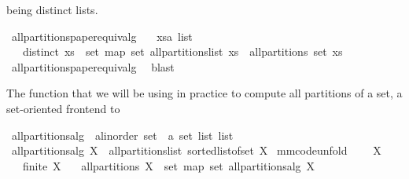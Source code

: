 \begin{isabellebody}
\begin{isamarkuptext}
  being distinct lists.%
\end{isamarkuptext}%
\isamarkuptrue%
\isamarkupfalse%
\ all{\isacharunderscore}partitions{\isacharunderscore}paper{\isacharunderscore}equiv{\isacharunderscore}alg{\isacharcolon}\isanewline
\ \ \ xs{\isacharcolon}{\isacharcolon}{\isachardoublequoteopen}{\isacharprime}a\ list{\isachardoublequoteclose}\isanewline
\ \ \ {\isachardoublequoteopen}distinct\ xs\ {\isasymLongrightarrow}\ set\ {\isacharparenleft}map\ set\ {\isacharparenleft}all{\isacharunderscore}partitions{\isacharunderscore}list\ xs{\isacharparenright}{\isacharparenright}\ {\isacharequal}\ all{\isacharunderscore}partitions\ {\isacharparenleft}set\ xs{\isacharparenright}{\isachardoublequoteclose}\isanewline
%
\isadelimproof
\ \ %
\endisadelimproof
%
\isatagproof
{}\isamarkupfalse%
\ all{\isacharunderscore}partitions{\isacharunderscore}paper{\isacharunderscore}equiv{\isacharunderscore}alg{\isacharprime}\ \isamarkupfalse%
\ blast%
\endisatagproof
{\isafoldproof}%
%
\isadelimproof
%
\endisadelimproof
%
\begin{isamarkuptext}%
The function that we will be using in practice to compute all partitions of a set,
  a set-oriented frontend to %
\end{isamarkuptext}%
\isamarkuptrue%
\isamarkupfalse%
\ all{\isacharunderscore}partitions{\isacharunderscore}alg\ {\isacharcolon}{\isacharcolon}\ {\isachardoublequoteopen}{\isacharprime}a{\isasymColon}linorder\ set\ {\isasymRightarrow}\ {\isacharprime}a\ set\ list\ list{\isachardoublequoteclose}\isanewline
{}\ {\isachardoublequoteopen}all{\isacharunderscore}partitions{\isacharunderscore}alg\ X\ {\isacharequal}\ all{\isacharunderscore}partitions{\isacharunderscore}list\ {\isacharparenleft}sorted{\isacharunderscore}list{\isacharunderscore}of{\isacharunderscore}set\ X{\isacharparenright}{\isachardoublequoteclose}\isanewline
\isanewline
\isanewline
{}\isamarkupfalse%
\ mm{}{}{\isacharbrackleft}code{\isacharunderscore}unfold{\isacharbrackright}{\isacharcolon}\ \isanewline
\ \ \ X\isanewline
\ \ \ {\isachardoublequoteopen}finite\ X{\isachardoublequoteclose}\isanewline
\ \ \ {\isachardoublequoteopen}all{\isacharunderscore}partitions\ X\ {\isacharequal}\ set\ {\isacharparenleft}map\ set\ {\isacharparenleft}all{\isacharunderscore}partitions{\isacharunderscore}alg\ X{\isacharparenright}{\isacharparenright}{\isachardoublequoteclose}\isanewline

\end{isabellebody}

